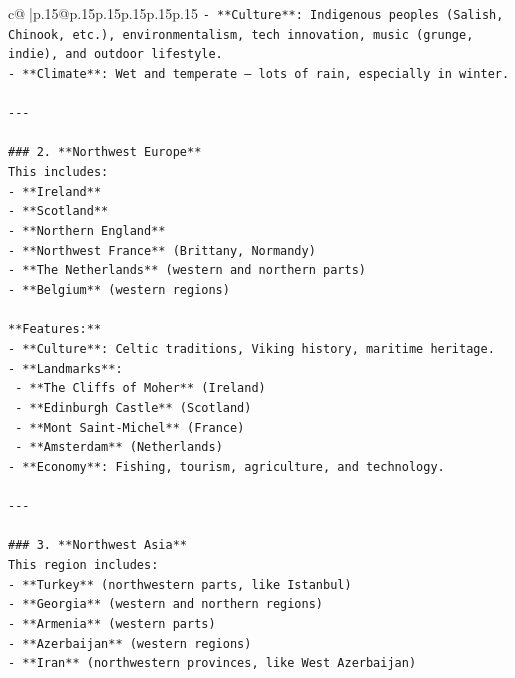 \documentclass{article}
\begin{document}
{\begin{supertabular}{c@{$\;$}|p{.15\linewidth}@{}p{.15\linewidth}p{.15\linewidth}p{.15\linewidth}p{.15\linewidth}p{.15\linewidth}}
{{{\texttt{{-} **Culture**: Indigenous peoples (Salish, Chinook, etc.), environmentalism, tech innovation, music (grunge, indie), and outdoor lifestyle.} \\
\texttt{{-} **Climate**: Wet and temperate — lots of rain, especially in winter.} \\
\\ 
\texttt{{-}{-}{-}} \\
\\ 
\texttt{\#\#\# 2. **Northwest Europe**} \\
\texttt{This includes:} \\
\texttt{{-} **Ireland**} \\
\texttt{{-} **Scotland**} \\
\texttt{{-} **Northern England**} \\
\texttt{{-} **Northwest France** (Brittany, Normandy)} \\
\texttt{{-} **The Netherlands** (western and northern parts)} \\
\texttt{{-} **Belgium** (western regions)} \\
\\ 
\texttt{**Features:**} \\
\texttt{{-} **Culture**: Celtic traditions, Viking history, maritime heritage.} \\
\texttt{{-} **Landmarks**:} \\
\texttt{  {-} **The Cliffs of Moher** (Ireland)} \\
\texttt{  {-} **Edinburgh Castle** (Scotland)} \\
\texttt{  {-} **Mont Saint{-}Michel** (France)} \\
\texttt{  {-} **Amsterdam** (Netherlands)} \\
\texttt{{-} **Economy**: Fishing, tourism, agriculture, and technology.} \\
\\ 
\texttt{{-}{-}{-}} \\
\\ 
\texttt{\#\#\# 3. **Northwest Asia**} \\
\texttt{This region includes:} \\
\texttt{{-} **Turkey** (northwestern parts, like Istanbul)} \\
\texttt{{-} **Georgia** (western and northern regions)} \\
\texttt{{-} **Armenia** (western parts)} \\
\texttt{{-} **Azerbaijan** (western regions)} \\
\texttt{{-} **Iran** (northwestern provinces, like West Azerbaijan)} \\
}}}
\end{supertabular}}
\end{document}
